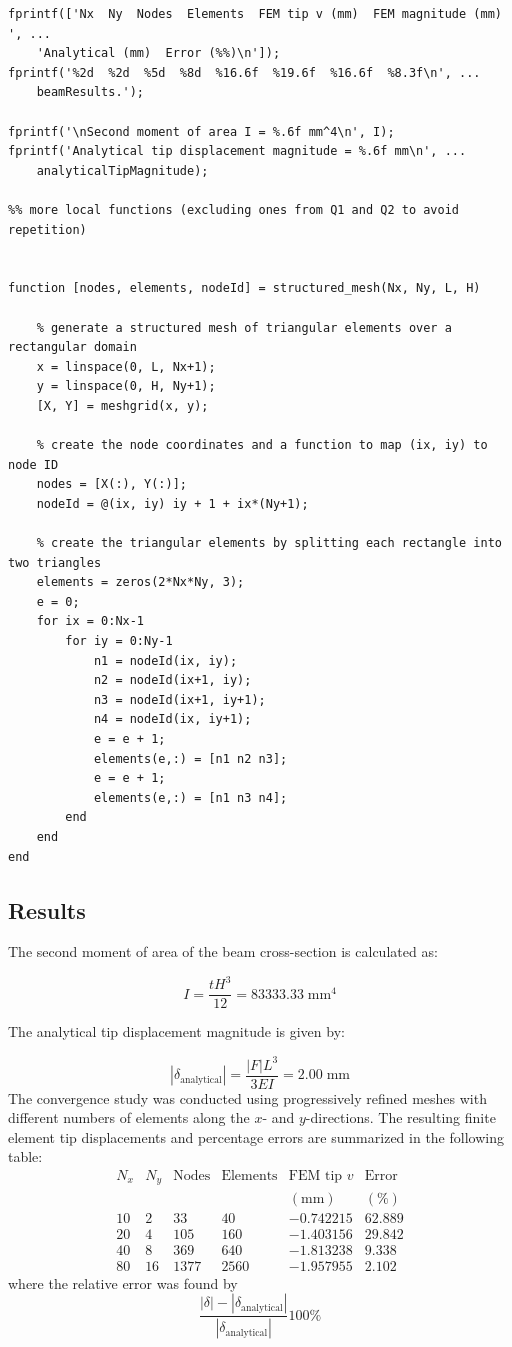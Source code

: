 \begin{lstlisting}[style=matlabcode]
fprintf(['Nx  Ny  Nodes  Elements  FEM tip v (mm)  FEM magnitude (mm)  ', ...
    'Analytical (mm)  Error (%%)\n']);
fprintf('%2d  %2d  %5d  %8d  %16.6f  %19.6f  %16.6f  %8.3f\n', ...
    beamResults.');

fprintf('\nSecond moment of area I = %.6f mm^4\n', I);
fprintf('Analytical tip displacement magnitude = %.6f mm\n', ...
    analyticalTipMagnitude);

%% more local functions (excluding ones from Q1 and Q2 to avoid repetition)


function [nodes, elements, nodeId] = structured_mesh(Nx, Ny, L, H)

    % generate a structured mesh of triangular elements over a rectangular domain
    x = linspace(0, L, Nx+1);
    y = linspace(0, H, Ny+1);
    [X, Y] = meshgrid(x, y);
    
    % create the node coordinates and a function to map (ix, iy) to node ID
    nodes = [X(:), Y(:)];
    nodeId = @(ix, iy) iy + 1 + ix*(Ny+1);
    
    % create the triangular elements by splitting each rectangle into two triangles
    elements = zeros(2*Nx*Ny, 3);
    e = 0;
    for ix = 0:Nx-1
        for iy = 0:Ny-1
            n1 = nodeId(ix, iy);
            n2 = nodeId(ix+1, iy);
            n3 = nodeId(ix+1, iy+1);
            n4 = nodeId(ix, iy+1);
            e = e + 1;
            elements(e,:) = [n1 n2 n3];
            e = e + 1;
            elements(e,:) = [n1 n3 n4];
        end
    end
end
\end{lstlisting}
\subsection{Results}
The second moment of area of the beam cross-section is calculated as:

\[
I =\frac{tH^3}{12}= 83333.33 \;\text{mm}^4
\]

The analytical tip displacement magnitude is given by:

\[
|\delta_{\text{analytical}}| = \frac{|F|L^3}{3EI}= 2.00 \;\text{mm}
\]
The convergence study was conducted using progressively refined meshes with different numbers of elements along the \(x\)- and \(y\)-directions. The resulting finite element tip displacements and percentage errors are summarized in the following table:
\[
\begin{array}{c|c|c|c|c|c|c}
N_x & N_y & \text{Nodes} & \text{Elements}
& \text{FEM tip }v
& \text{Error} \\
& & & & (\text{mm}) & (\%) \\
\hline
10 & 2 & 33 & 40 & -0.742215   & 62.889 \\
20 & 4 & 105 & 160 & -1.403156   & 29.842 \\
40 & 8 & 369 & 640 & -1.813238   & 9.338 \\
80 & 16 & 1377 & 2560 & -1.957955  & 2.102
\end{array}
\]
where the relative error was found by
$$\frac{|\delta| - |\delta_{\text{analytical}}|}{|\delta_{\text{analytical}}|}100\%$$

